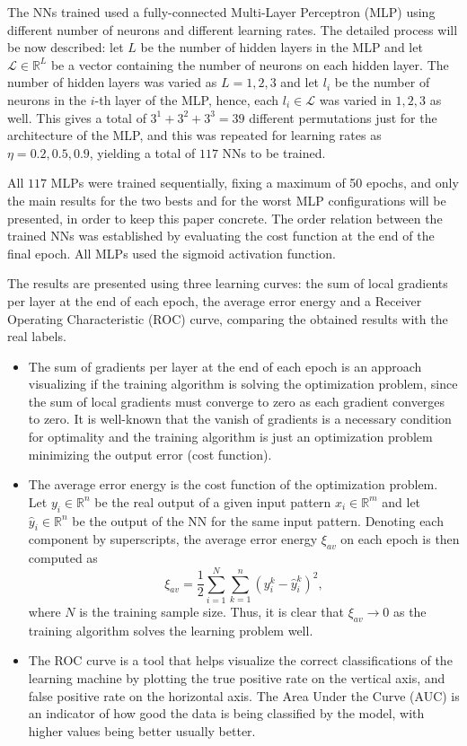 \documentclass[conference]{IEEEtran}
\theoremstyle{definition}
\theoremstyle{remark}
\theoremstyle{remark}
\begin{document}
The NNs trained used a fully-connected Multi-Layer Perceptron (MLP) using
different number of neurons and different learning rates. The detailed process
will be now described: let $L$ be the number of hidden layers in the MLP and let
$\mathcal{L}\in\mathbb{R}^{L}$ be a vector containing the number of neurons on
each hidden layer. The number of hidden layers was varied as $L=1,2,3$ and let
$l_i$ be the number of neurons in the $i$-th layer of the MLP, hence, each
$l_i\in\mathcal{L}$ was varied in $1,2,3$ as well. This gives a total of
$3^1+3^2+3^3=39$ different permutations just for the architecture of the MLP,
and this was repeated for learning rates as $\eta=0.2,0.5,0.9$, yielding a total
of $117$ NNs to be trained.

All $117$ MLPs were trained sequentially, fixing a maximum of 50 epochs,
and only the main results for the two bests and for the worst MLP configurations
will be presented, in order to keep this paper concrete. The order relation
between the trained NNs was established by evaluating the cost function at the
end of the final epoch. All MLPs used the sigmoid activation function.

The results are presented using three learning curves: the sum of local
gradients per layer at the end of each epoch, the average error energy and a
Receiver Operating Characteristic (ROC) curve, comparing the obtained results
with the real labels.
\begin{itemize}
  \item The sum of gradients per layer at the end of each epoch is an approach
  visualizing if the training algorithm is solving the optimization problem,
  since the sum of local gradients must converge to zero as each gradient
  converges to zero. It is well-known that the vanish of gradients is a
  necessary condition for optimality and the training algorithm is just an
  optimization problem minimizing the output error (cost function).
  \item The average error energy is the cost function of the optimization
  problem. Let $y_i\in\mathbb{R}^n$ be the real output of a given input pattern
  $x_i\in\mathbb{R}^m$ and let $\hat{y}_i\in\mathbb{R}^n$ be the output of the
  NN for the same input pattern. Denoting each component by superscripts, the
  average error energy $\xi_{av}$ on each epoch is then computed as
  \begin{equation}
    \xi_{av}=\dfrac{1}{2}\sum_{i=1}^{N}\sum_{k=1}^n\left(y^k_i-\hat{y}^k_i\right)^2,
  \end{equation}
  where $N$ is the training sample size. Thus, it is clear that
  $\xi_{av}\rightarrow0$ as the training algorithm solves the learning problem
  well.
  \item The ROC curve is a tool that helps visualize the correct classifications
  of the learning machine by plotting the true positive rate on the vertical
  axis, and false positive rate on the horizontal axis. The Area Under the Curve
  (AUC) is an indicator of how good the data is being classified by the model,
  with higher values being better usually better.
\end{itemize}
\end{document}
